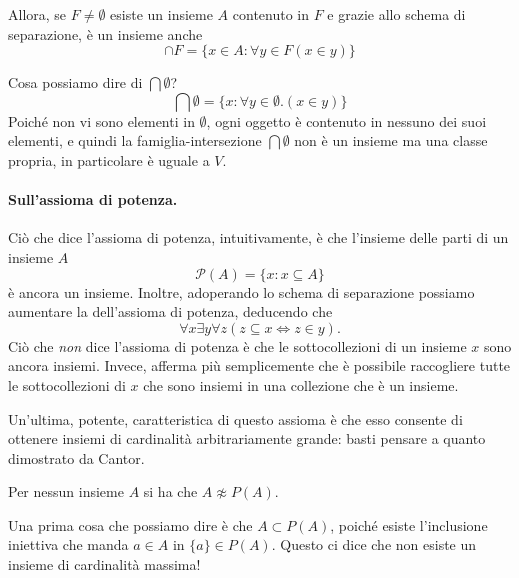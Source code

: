 Allora, se \(F \ne \emptyset\) esiste un insieme \(A\) contenuto in \(F\) e grazie allo schema di separazione, è un insieme anche
\begin{equation*}
  \cap F = \lbrace x \in A \colon \forall y \in F (x \in y)\rbrace
\end{equation*}

Cosa possiamo dire di \(\bigcap\emptyset{}\)?
\begin{equation*}
  \bigcap\emptyset = \lbrace x \colon \forall y \in \emptyset. (x \in y) \rbrace
\end{equation*}
Poiché non vi sono elementi in \(\emptyset{}\), ogni oggetto è contenuto in nessuno dei suoi elementi, e quindi la famiglia-intersezione \(\bigcap\emptyset{}\) non è un insieme ma una classe propria, in particolare è uguale a \(V\).

\paragraph{Sull'assioma di potenza.} Ciò che dice l'assioma di potenza, intuitivamente, è che l'insieme delle parti di un insieme \(A\)
\begin{equation}
  \mathcal{P}(A) = \lbrace x \colon x \subseteq A \rbrace
\end{equation}
è ancora un insieme. Inoltre, adoperando lo schema di separazione possiamo aumentare la  dell'assioma di potenza, deducendo che
\begin{equation}
  \forall x \exists y \forall z (z \subseteq x \iff z \in y).
\end{equation}
Ciò che \emph{non} dice l'assioma di potenza è che le sottocollezioni di un insieme \(x\) sono ancora insiemi. Invece, afferma più semplicemente che è possibile raccogliere tutte le sottocollezioni di \(x\) che sono insiemi in una collezione che è un insieme.

Un'ultima, potente, caratteristica di questo assioma è che esso consente di ottenere insiemi di cardinalità arbitrariamente grande: basti pensare a quanto dimostrato da Cantor.

\begin{thm}[Cantor]
  Per nessun insieme \(A\) si ha che \(A \not\approx P(A)\).
\end{thm}

Una prima cosa che possiamo dire è che \(A \subset P(A)\), poiché esiste l'inclusione iniettiva che manda \(a \in A\) in \(\lbrace a \rbrace \in P(A)\). Questo ci dice che non esiste un insieme di cardinalità massima!

